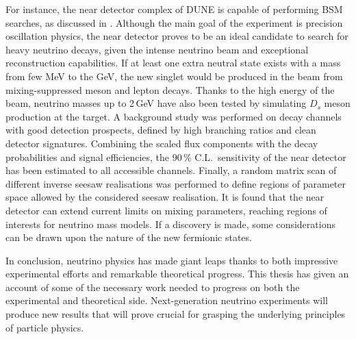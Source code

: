For instance, the near detector complex of DUNE is capable of performing BSM searches, %
as discussed in .
Although the main goal of the experiment is precision oscillation physics, %
the near detector proves to be an ideal candidate to search for heavy neutrino decays, %
given the intense neutrino beam and exceptional reconstruction capabilities.
If at least one extra neutral state exists with a mass from few MeV to the GeV, %
the new singlet would be produced in the beam from mixing-suppressed meson and lepton decays.
Thanks to the high energy of the beam, neutrino masses up to 2\,GeV have also been tested %
by simulating $D_s$ meson production at the target.
A background study was performed on decay channels with good detection prospects, %
defined by high branching ratios and clean detector signatures.
Combining the scaled flux components with the decay probabilities and signal efficiencies, %
the 90\,\% C.L.\ sensitivity of the near detector has been estimated to all accessible channels.
Finally, a random matrix scan of different inverse seesaw realisations was performed %
to define regions of parameter space allowed by the considered seesaw realisation.
It is found that the near detector can extend current limits on mixing parameters, %
reaching regions of interests for neutrino mass models.
If a discovery is made, some considerations can be drawn upon the nature of the new fermionic states.


In conclusion, neutrino physics has made giant leaps thanks to both impressive experimental efforts %
and remarkable theoretical progress.
This thesis has given an account of some of the necessary work needed to progress on both %
the experimental and theoretical side.
Next-generation neutrino experiments will produce new results that will prove crucial for grasping the underlying %
principles of particle physics.

